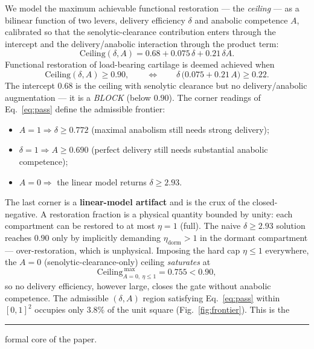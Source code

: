 \documentclass[11pt,a4paper]{article}
\newcommand{\tierdisc}[1]{\textcolor{#1}{\rule[0.05ex]{1.0ex}{1.0ex}}}
\newcommand{\tierBlue}{\tierdisc{blue!70!black}}   %
\begin{document}
We model the maximum achievable functional restoration --- the \emph{ceiling} ---
as a bilinear function of two levers, delivery efficiency $\delta$ and anabolic
competence $A$, calibrated so that the senolytic-clearance contribution enters
through the intercept and the delivery/anabolic interaction through the product
term:
\begin{equation}
  \mathrm{Ceiling}(\delta,A) = 0.68 + 0.075\,\delta + 0.21\,\delta A .
  \label{eq:ceiling}
\end{equation}
Functional restoration of load-bearing cartilage is deemed achieved when
\begin{equation}
  \mathrm{Ceiling}(\delta,A) \ge 0.90 ,
  \qquad\Longleftrightarrow\qquad
  \delta\,\bigl(0.075 + 0.21\,A\bigr) \ge 0.22 .
  \label{eq:pass}
\end{equation}
The intercept $0.68$ is the ceiling with senolytic clearance but no delivery/anabolic
augmentation --- it is a \emph{BLOCK} (below $0.90$). The corner readings of
Eq.~\eqref{eq:pass} define the admissible frontier:
\begin{itemize}
  \item $A=1 \Rightarrow \delta \ge 0.772$ (maximal anabolism still needs strong
  delivery);
  \item $\delta=1 \Rightarrow A \ge 0.690$ (perfect delivery still needs
  substantial anabolic competence);
  \item $A=0 \Rightarrow$ the linear model returns $\delta \ge 2.93$.
\end{itemize}
The last corner is a \textbf{linear-model artifact} and is the crux of the
closed-negative. A restoration fraction is a physical quantity bounded by unity:
each compartment can be restored to at most $\eta=1$ (full). The naive
$\delta\ge2.93$ solution reaches $0.90$ only by implicitly demanding
$\eta_{\mathrm{dorm}}>1$ in the dormant compartment --- over-restoration, which is
unphysical. Imposing the hard cap $\eta\le1$ everywhere, the $A=0$
(senolytic-clearance-only) ceiling \emph{saturates} at
\begin{equation}
  \mathrm{Ceiling}_{A=0,\ \eta\le1}^{\ \max} = 0.755 < 0.90 ,
  \label{eq:saturate}
\end{equation}
so no delivery efficiency, however large, closes the gate without anabolic
competence. The admissible $(\delta,A)$ region satisfying Eq.~\eqref{eq:pass}
within $[0,1]^2$ occupies only $3.8\%$ of the unit square
(Fig.~\ref{fig:frontier}). This is the \tierBlue{} formal core of the paper.
\end{document}
